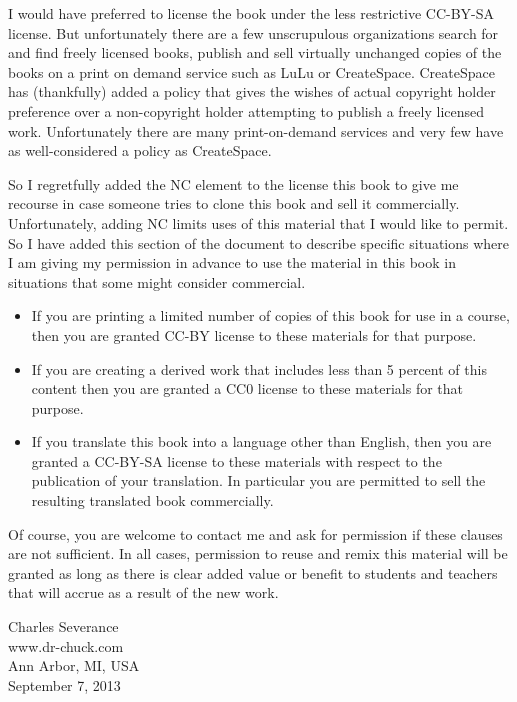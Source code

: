 \documentclass[11pt]{book}
\begin{document}
I would have preferred to license the book under the less 
restrictive CC-BY-SA license.   But unfortunately there are
a few unscrupulous
organizations search for and find freely licensed books,
publish and sell virtually unchanged copies of the books on a 
print on demand service such as LuLu or CreateSpace.  CreateSpace
has (thankfully) added a policy that gives the wishes of actual 
copyright holder preference over a non-copyright holder attempting 
to publish a freely licensed work.  Unfortunately there are many 
print-on-demand services and very few have as well-considered a policy 
as CreateSpace.

So I regretfully added the NC element to the license
this book to give me recourse in case someone tries to clone this 
book and sell it commercially.   Unfortunately, adding NC limits uses
of this material that I would like to permit.  So I have added this 
section of the document to describe specific situations where 
I am giving my permission in advance to use the material in this book
in situations that some might consider commercial.

\begin{itemize}
\item If you are printing a limited number of copies of this book for use 
in a course, then you are granted CC-BY license to these materials 
for that purpose.

\item If you are creating a derived work that includes less than 5 percent 
of this content then you are granted a CC0 license to these materials 
for that purpose.

\item If you translate this book into a language other than English, then 
you are granted a CC-BY-SA license to these materials with respect to 
the publication of your translation. In particular you are permitted 
to sell the resulting translated book commercially.
\end{itemize}

Of course, you are welcome to contact me and ask for permission if these
clauses are not sufficient.  In all cases, permission to reuse and
remix this material will be granted as long as there is clear added value
or benefit to students and teachers that will accrue as a result of the 
new work.

Charles Severance\\
www.dr-chuck.com\\
Ann Arbor, MI, USA\\
September 7, 2013



\normalsize

\printindex

\clearemptydoublepage
\end{document}
